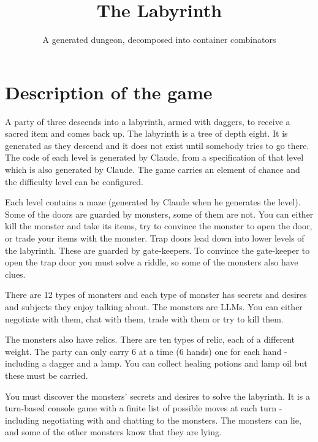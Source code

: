 \documentclass[11pt,a4paper]{article}
\title{\vspace{-2em}The Labyrinth}
\author{\normalsize A generated dungeon, decomposed into container combinators}
\date{}
\begin{document}
\maketitle
\vspace{-2em}

\section{Description of the game}
\label{sec:description}

\begin{sectionbox}
A party of three descends into a labyrinth, armed with daggers, to receive a sacred item and comes
back up. The labyrinth is a tree of depth eight. It is generated as they descend and it does not
exist until somebody tries to go there. The code of each level is generated by Claude, from a
specification of that level which is also generated by Claude. The game carries an element of
chance and the difficulty level can be configured.

\medskip

Each level contains a maze (generated by Claude when he generates the level). Some of the doors are guarded by
monsters, some of them are not. You can either kill the monster and take its items, try to
convince the monster to open the door, or trade your items with the monster. Trap doors lead down
into lower levels of the labyrinth. These are guarded by gate-keepers. To convince the gate-keeper
to open the trap door you must solve a riddle, so some of the monsters also have clues.

\medskip

There are 12 types of monsters and each type of monster has secrets and desires and subjects they
enjoy talking about. The monsters are LLMs. You can either negotiate with them, chat with them,
trade with them or try to kill them.

\medskip

The monsters also have relics. There are ten types of relic, each of a different weight. The party
can only carry 6 at a time (6 hands) one for each hand - including a dagger and a lamp. You can
collect healing potions and lamp oil but these must be carried.

\medskip

You must discover the monsters' secrets and desires to solve the labyrinth. It is a turn-based console game with a finite
list of possible moves at each turn - including negotiating with and chatting to the monsters. The monsters can lie, and some of the other monsters know that
they are lying.


\end{sectionbox}
\end{document}
